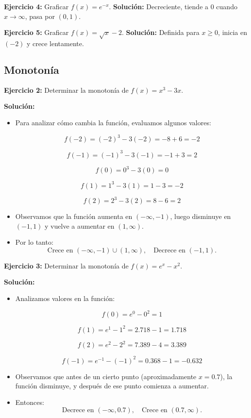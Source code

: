 \documentclass{profesor}
\begin{document}
\textbf{Ejercicio 4:} Graficar \( f(x) = e^{-x} \).  
\textbf{Solución:} Decreciente, tiende a \( 0 \) cuando \( x \to \infty \), pasa por \( (0,1) \).  

\textbf{Ejercicio 5:} Graficar \( f(x) = \sqrt{x} - 2 \).  
\textbf{Solución:} Definida para \( x \geq 0 \), inicia en \( (-2) \) y crece lentamente.  


\newpage
\subsection{Monotonía}

\textbf{Ejercicio 2:} Determinar la monotonía de \( f(x) = x^3 - 3x \).

\textbf{Solución:}  
\begin{itemize}
    \item Para analizar cómo cambia la función, evaluamos algunos valores:
    
    \[
    f(-2) = (-2)^3 - 3(-2) = -8 + 6 = -2
    \]
    
    \[
    f(-1) = (-1)^3 - 3(-1) = -1 + 3 = 2
    \]
    
    \[
    f(0) = 0^3 - 3(0) = 0
    \]
    
    \[
    f(1) = 1^3 - 3(1) = 1 - 3 = -2
    \]
    
    \[
    f(2) = 2^3 - 3(2) = 8 - 6 = 2
    \]

    \item Observamos que la función aumenta en \( (-\infty, -1) \), luego disminuye en \( (-1,1) \) y vuelve a aumentar en \( (1, \infty) \).
    \item Por lo tanto:
    \[
    \text{Crece en } (-\infty, -1) \cup (1, \infty), \quad \text{Decrece en } (-1,1).
    \]
\end{itemize}

\textbf{Ejercicio 3:} Determinar la monotonía de \( f(x) = e^x - x^2 \).

\textbf{Solución:}  
\begin{itemize}
    \item Analizamos valores en la función:
    
    \[
    f(0) = e^0 - 0^2 = 1
    \]
    
    \[
    f(1) = e^1 - 1^2 = 2.718 - 1 = 1.718
    \]
    
    \[
    f(2) = e^2 - 2^2 = 7.389 - 4 = 3.389
    \]
    
    \[
    f(-1) = e^{-1} - (-1)^2 = 0.368 - 1 = -0.632
    \]

    \item Observamos que antes de un cierto punto (aproximadamente \( x = 0.7 \)), la función disminuye, y después de ese punto comienza a aumentar.
    \item Entonces:
    \[
    \text{Decrece en } (-\infty, 0.7), \quad \text{Crece en } (0.7, \infty).
    \]
\end{itemize}
\end{document}
